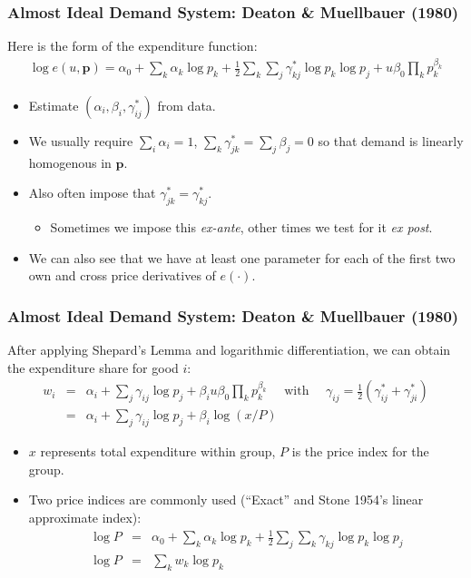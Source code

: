 \documentclass[aspectratio=169,11pt]{beamer}
\begin{document}
\begin{frame}
\frametitle{Almost Ideal Demand System: Deaton \& Muellbauer (1980)}
\small
Here is the form of the expenditure function:
\begin{eqnarray*}
\log e(u,\symbf{p}) =  \alpha_0 + \sum_k \alpha_k \log p_k + \frac{1}{2} \sum_k \sum_j \gamma_{kj}^{*} \log p_k \log p_j + u \beta_0 \prod_k p_k^{\beta_k}
\end{eqnarray*}
\begin{itemize}
\item Estimate $(\alpha_i, \beta_i, \gamma_{ij}^*)$ from data.
\item We usually require $\sum_i \alpha_i =1$, $\sum_k \gamma_{jk}^* = \sum_j  \beta_j = 0$ so that demand is linearly homogenous in $\symbf{p}$.
\item Also often impose that $\gamma_{jk}^* = \gamma_{kj}^*$.
\begin{itemize}
\item Sometimes we impose this \textit{ex-ante}, other times we test for it \textit{ex post}.
\end{itemize}
\item We can also see that we have at least one parameter for each of the first two own and cross price derivatives of $e(\cdot)$.
\end{itemize}
\end{frame}

\begin{frame}
\frametitle{Almost Ideal Demand System: Deaton \& Muellbauer (1980)}
\small
After applying Shepard's Lemma and logarithmic differentiation, we can obtain the expenditure share for good $i$:
\begin{eqnarray*}
w_i &=&\alpha_i + \sum_j \gamma_{ij} \log p_j + \beta_i u \beta_0 \prod_k p_k^{\beta_k} \quad \mbox{ with } \quad \gamma_{ij}= \frac{1}{2} (\gamma_{ij}^* + \gamma_{ji}^*) \\
      &=& \alpha_i + \sum_j \gamma_{ij} \log p_j + \beta_i \log (x / P)
\end{eqnarray*}
\vspace{-0.5cm}
\begin{itemize}
\item $x$ represents total expenditure within group, $P$ is the price index for the group.
\item Two price indices are commonly used (``Exact'' and Stone 1954's linear approximate index):
\begin{eqnarray*}
\log P &=&\alpha_0 + \sum_k \alpha_k \log p_k + \frac{1}{2} \sum_j \sum_k \gamma_{kj} \log p_k \log p_j\\
\log P &=& \sum_k w_k \log p_k
\end{eqnarray*}
\end{itemize}
\end{frame}
\end{document}
